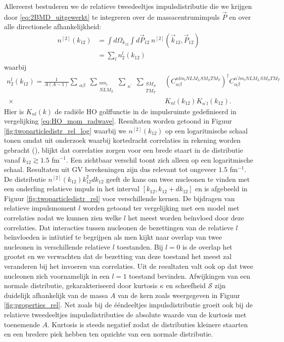 \documentclass[11pt,twoside]{book}
\begin{document}
Allereerst bestuderen we de relatieve tweedeeltjes impulsdistributie die we krijgen door  \eqref{eq:2BMD_uitgewerkt} te integreren over de massacentrumimpuls $\vec{P}$ en over alle directionele afhankelijkheid:
\begin{align} \label{eq:rel_two}
n^{[2]}(k_{12}) & = \int d\Omega_{k_{12}}\int d\vec{P}_{12}\ n^{[2]}(\vec{k}_{12},\vec{P}_{12}) \nonumber \\
							& = \sum_{l} n_2^{l}(k_{12})
\end{align}
waarbij
\begin{align*}
n_2^{l}(k_{12}) = \frac{1}{A(A-1)} \sum_{\substack{\alpha \beta}} \sum_{\substack{nm_l \\ NLM_L}} \sum_{\substack{n^{\prime} }} \sum_{\substack{S M_S \\T M_T}} &  \left( C_{\alpha \beta}^{nlm_l NLM_L  S M_S T M_T} \right)^\dagger  C_{\alpha \beta}^{ n^{\prime} lm_l NLM_L  S M_S T M_T} \\ \ \times & K_{nl}(k_{12}) K_{n^{\prime} l}(k_{12}).
\end{align*}
Hier is $K_{nl}(k)$ de radi\"{e}le HO golffunctie in de impulsruimte gedefinieerd in vergelijking \eqref{eq:HO_mom_radwave}.
Resultaten worden getoond in Figuur \ref{fig:twoparticledistr_rel_log} waarbij we $n^{[2]}(k_{12})$ op een logaritmische schaal tonen omdat uit onderzoek waarbij kortedracht correlaties in rekening worden gebracht (\cite{maarten,wiringa2014nucleon}), blijkt dat correlaties zorgen voor een brede staart in de distributie vanaf $k_{12} \gtrsim 1.5$ fm$^{-1}$. Een zichtbaar verschil toont zich alleen op een logaritmische schaal.  Resultaten uit GV berekeningen zijn dus relevant tot ongeveer $1.5$ fm$^{-1}$. De distributie $n^{[2]}(k_{12})k_{12}^2dk_{12}$ geeft de kans om twee nucleonen te vinden met een onderling relatieve impuls in het interval $[ k_{12}, k_{12}+ d k_{12} ]$ en is afgebeeld in Figuur \ref{fig:twoparticledistr_rel} voor verschillende kernen. De bijdragen van relatieve impulsmoment $l$ worden getoond ter vergelijking met een model met correlaties zodat we kunnen zien welke $l$ het meest worden be\"{i}nvloed door deze correlaties. Dat interacties tussen nucleonen de bezettingen van de relatieve $l$ be\"{i}nvloeden is int\"{i}utief te begrijpen als men kijkt naar overlap van twee nucleonen in verschillende relatieve $l$ toestanden. Bij $l=0$ is de overlap het grootst en we verwachten dat de bezetting van deze toestand het meest zal veranderen bij het invoeren van correlaties. Uit de resultaten valt ook op dat twee nucleonen zich voornamelijk in een $l=1$ toestand bevinden. Afwijkingen van een normale distributie, gekarakteriseerd door kurtosis $\kappa$ en scheefheid $\mathcal{S}$ zijn duidelijk afhankelijk van de massa $A$ van de kern zoals weergegeven in Figuur \ref{fig:properties_rel}. Net zoals bij de \'{e}\'{e}ndeeltjes impulsdistributie groeit ook bij de relatieve tweedeeltjes impulsdistributies de absolute waarde van de kurtosis met toenemende $A$. Kurtosis is steeds negatief zodat de distributies kleinere staarten en een bredere piek hebben ten opzichte van een normale distributie. 
\end{document}
